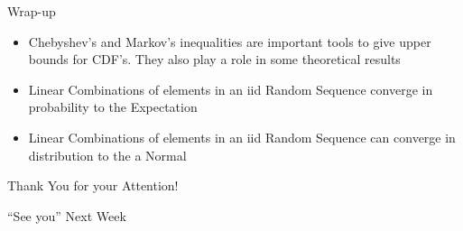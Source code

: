 \documentclass[notes=show,smaller,handout]{beamer}\usepackage[]{graphicx}\usepackage[]{color}
\begin{document}
\begin{frame}{\secname}{Wrap-up}
  \begin{itemize}
  \item Chebyshev's and Markov's inequalities are important tools to give upper bounds for CDF's. They also play a role in some theoretical results\bigskip
  \item Linear Combinations of elements in an iid Random Sequence converge in probability to the Expectation\bigskip
  \item Linear Combinations of elements in an iid Random Sequence can converge in distribution to the a Normal\bigskip
  \end{itemize}
\end{frame}

\begin{frame}{\secname}
  \begin{center}
  \Large{Thank You for your Attention!}

  \bigskip
  \pause

  \Large{``See you'' Next Week}
  \end{center}
\end{frame}
\end{document}
